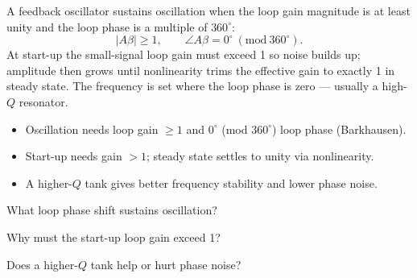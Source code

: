 \begin{workedexample}
A feedback oscillator sustains oscillation when the loop gain magnitude
is at least unity and the loop phase is a multiple of $360^{\circ}$:
\[ |A\beta| \ge 1, \qquad \angle A\beta = 0^{\circ}\ (\mathrm{mod}\ 360^{\circ}). \]
At start-up the small-signal loop gain must exceed 1 so noise builds up; amplitude
then grows until nonlinearity trims the effective gain to exactly 1 in steady
state. The frequency is set where the loop phase is zero --- usually a high-$Q$
resonator.
\end{workedexample}

\begin{keytakeaways}
\begin{itemize}[leftmargin=1.4em,itemsep=2pt]
\item Oscillation needs loop gain $\ge 1$ and $0^{\circ}$ (mod $360^{\circ}$) loop phase (Barkhausen).
\item Start-up needs gain $>1$; steady state settles to unity via nonlinearity.
\item A higher-$Q$ tank gives better frequency stability and lower phase noise.
\end{itemize}
\end{keytakeaways}

\begin{exercises}
\item What loop phase shift sustains oscillation?
\item Why must the start-up loop gain exceed 1?
\item Does a higher-$Q$ tank help or hurt phase noise?
\end{exercises}


